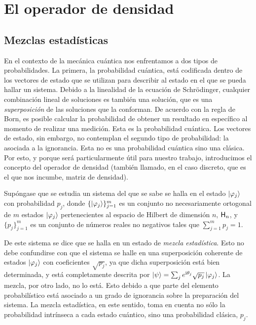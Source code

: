 \section{El operador de densidad}
\label{sec:ch2_density_operator}

\subsection{Mezclas estadísticas}


En el contexto de la mecánica cuántica nos enfrentamos a dos tipos de probabilidades. La primera, la probabilidad cuántica, está codificada dentro de los vectores de estado que se utilizan para describir al estado en el que se pueda hallar un sistema. Debido a la linealidad de la ecuación de Schrödinger, cualquier combinación lineal de soluciones es también una solución, que es una \textit{superposición} de las soluciones que la conforman. De acuerdo con la regla de Born, es posible calcular la probabilidad de obtener un resultado en específico al momento de realizar una medición. Esta es la probabilidad cuántica. Los vectores de estado, sin embargo, no contemplan el segundo tipo de probabilidad: la asociada a la ignorancia. Esta no es una probabilidad cuántica sino una clásica. Por esto, y porque será particularmente útil para nuestro trabajo, introducimos el concepto del operador de densidad (también llamado, en el caso discreto, que es el que nos incumbe, matriz de densidad).



Supóngase que se estudia un sistema del que se sabe se halla en el estado $\ket{\varphi_{j}}$ con probabilidad $p_{j}$, donde $\{\ket{\varphi_{j}}\}_{j=1}^{m}$ es un conjunto no necesariamente ortogonal de $m$ estados $\ket{\varphi_{j}}$ pertenecientes al espacio de Hilbert de dimensión $n$, ${\sf H}_{n}$, y $\{p_{j}\}_{j=1}^{m}$ es un conjunto de números reales no negativos tales que $\sum_{j=1}^{m} p_{j}=1$.

De este sistema se dice que se halla en un estado de \textit{mezcla estadística}. Esto no debe confundirse con que el sistema se halle en una superposición coherente de estados $\ket{\varphi_{j}}$ con coeficientes $\sqrt{p_{j}}$, ya que dicha superposición está bien determinada, y está completamente descrita por $\ket{\psi}=\sum_{j} e^{\text{i} \theta_j} \sqrt{p_{j}}\ket{\varphi_{j}}$. La mezcla, por otro lado, no lo está. Esto debido a que parte del elemento probabilístico está asociado a un grado de ignorancia sobre la preparación del sistema. La mezcla estadística, en este sentido, toma en cuenta no sólo la probabilidad intrínseca a cada estado cuántico, sino una probabilidad clásica, $p_{j}$. 

